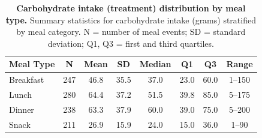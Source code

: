 \begin{table}[ht]
\centering
\small
\caption{\textbf{Carbohydrate intake (treatment) distribution by meal type.}
Summary statistics for carbohydrate intake (grams) stratified by meal category.
N = number of meal events; SD = standard deviation; Q1, Q3 = first and third quartiles.}
\label{tab:treatment_meal}
\begin{tabular}{lccccccc}
\toprule
Meal Type & N & Mean & SD & Median & Q1 & Q3 & Range \\
\midrule
Breakfast & 247 & 46.8 & 35.5 & 37.0 & 23.0 & 60.0 & 1--150 \\
Lunch & 280 & 64.4 & 37.2 & 51.5 & 39.8 & 85.0 & 5--175 \\
Dinner & 238 & 63.3 & 37.9 & 60.0 & 39.0 & 75.0 & 5--200 \\
Snack & 211 & 26.9 & 15.9 & 24.0 & 15.0 & 36.0 & 1--90 \\
\bottomrule
\end{tabular}
\end{table}
